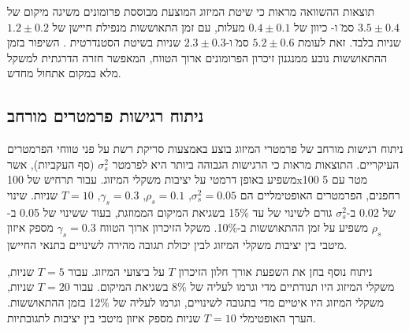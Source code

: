 \begin{table}[htbp]
\centering
\caption{השוואת ביצועי מיזוג חיישנים בשיטות שונות.}
\label{tab:ch05_fusion_comparison}
\end{table}

תוצאות ההשוואה מראות כי שיטת המיזוג המוצעת מבוססת פרומונים משיגה  מיקום של $3.5 \pm 0.4$ ס\"מ ו- כיוון של $0.4 \pm 0.1$ מעלות, עם זמן התאוששות מנפילת חיישן של $1.2 \pm 0.2$ שניות בלבד. זאת לעומת $5.2 \pm 0.6$ ס\"מ ו-$2.3 \pm 0.3$ שניות בשיטת  הסטנדרטית \cite{Lynen2013Fusion}. השיפור בזמן ההתאוששות נובע ממנגנון זיכרון הפרומונים ארוך הטווח, המאפשר חזרה הדרגתית למשקל מלא במקום אתחול מחדש.

\subsection{ניתוח רגישות פרמטרים מורחב}
\label{sec:ch05_sensitivity_analysis}

ניתוח רגישות מורחב של פרמטרי המיזוג בוצע באמצעות סריקת רשת על פני טווחי הפרמטרים העיקריים. התוצאות מראות כי הרגישות הגבוהה ביותר היא לפרמטר $\sigma_{s}^{2}$ (סף העקביות), אשר משפיע באופן דרמטי על יציבות משקלי המיזוג. עבור תרחיש  של 100x100 מטר עם 5 רחפנים, הפרמטרים האופטימליים הם $\sigma_{s}^{2} = 0.05$, $\rho_{s} = 0.1$, $\gamma_{s} = 0.3$, $T = 10$ שניות. שינוי של 0.02 ב-$\sigma_{s}^{2}$ גורם לשינוי של עד 15\% בשגיאת המיקום הממוזגת, בעוד ששינוי של 0.05 ב-$\rho_{s}$ משפיע על זמן ההתאוששות ב-10\%. משקל הזיכרון ארוך הטווח $\gamma_{s} = 0.3$ מספק איזון מיטבי בין יציבות משקלי המיזוג לבין יכולת תגובה מהירה לשינויים בתנאי החיישן.

ניתוח נוסף בחן את השפעת אורך חלון הזיכרון $T$ על ביצועי המיזוג. עבור $T = 5$ שניות, משקלי המיזוג היו תנודתיים מדי וגרמו לעליה של 8\% בשגיאת המיקום. עבור $T = 20$ שניות, משקלי המיזוג היו איטיים מדי בתגובה לשינויים, וגרמו לעליה של 12\% בזמן ההתאוששות. הערך האופטימלי $T = 10$ שניות מספק איזון מיטבי בין יציבות לתגובתיות.

